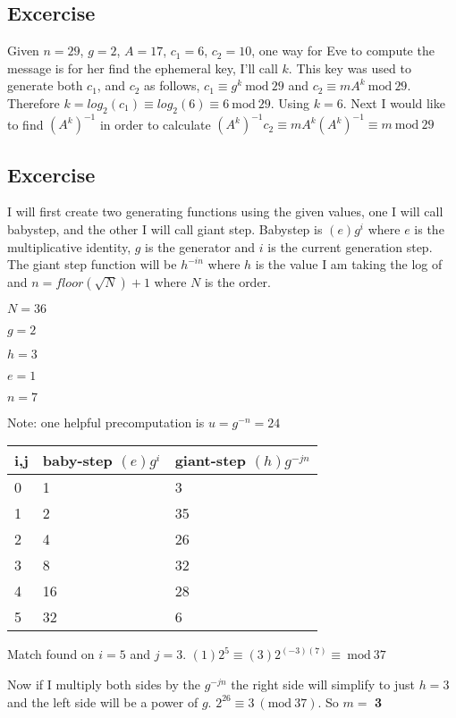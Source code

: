 \documentclass{article}
\begin{document}
\subsection{Excercise}
Given $n = 29$, $g = 2$, $A = 17$, $c_1 = 6$, $c_2 = 10$, one way for Eve to compute the message is for her find the ephemeral key, I'll call $k$. This key was used to generate both $c_1$, and $c_2$ as follows, $c_1 \equiv g^{k}\ \textrm{mod}\ 29$ and $c_2 \equiv mA^{k}\ \textrm{mod}\ 29$. Therefore $k = log_2(c_1) \equiv log_2(6)\equiv 6\ \textrm{mod}\ 29$. Using $k = 6$. Next I would like to find $(A^{k})^{-1}$ in order to calculate $(A^{k})^{-1}c_2 \equiv mA^k(A^{k})^{-1} \equiv m\ \textrm{mod}\ 29$
\subsection{Excercise}
I will first create two generating functions using the given values, one I will call babystep, and the other I will call giant step. Babystep is $(e)g^{i}$ where $e$ is the multiplicative identity, $g$ is the generator and $i$ is the current generation step. The giant step function will be $h^{-in}$ where $h$ is the value I am taking the log of and $n = floor(\sqrt{N}) + 1$ where $N$ is the order.

$N = 36$

$g = 2$

$h = 3$

$e = 1$

$n = 7$

Note: one helpful precomputation is $u = g^{-n} = 24$

\begin{center}
\begin{tabular}{|lll|}
\hline
	i,j & baby-step $(e)g^{i}$ & giant-step $(h)g^{-jn}$ \\
\hline
0 & 1 & 3 \\
1 & 2 & 35 \\
2 & 4 & 26 \\
3 & 8 & 32 \\
4 & 16 & 28 \\
5 & 32 & 6 \\
\hline
\end{tabular}
\end{center}
Match found on $i = 5$ and $j = 3$. $(1)2^{5} \equiv (3)2^{(-3)(7)} \equiv\ \textrm{mod}\ 37$

Now if I multiply both sides by the $g^{-jn}$ the right side will simplify to just $h = 3$ and the left side will be a power of $g$. $2^{26} \equiv 3\ (\textrm{mod}\ 37)$. So $m =$ \textbf{3}
\end{document}
